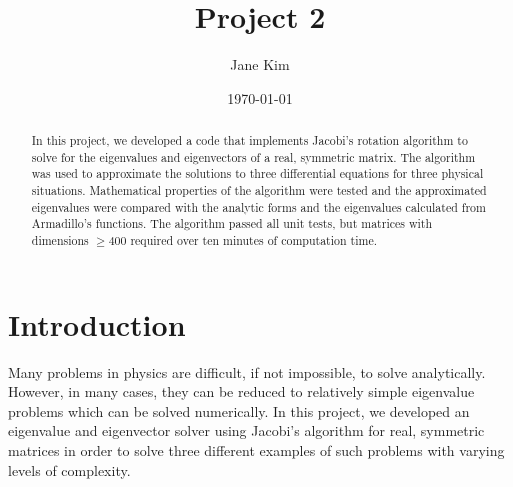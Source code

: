 \documentclass[prb,aps,twocolumn,showpacs,10pt]{revtex4-1}
\begin{document}
\title {Project 2}

\author{Jane Kim}
\date{\today}


\begin{abstract}

\vspace*{5mm}
\noindent In this project, we developed a code that implements Jacobi's rotation algorithm to solve for the eigenvalues and eigenvectors of a real, symmetric matrix. The algorithm was used to approximate the solutions to three differential equations for three physical situations. Mathematical properties of the algorithm were tested and the approximated eigenvalues were compared with the analytic forms and the eigenvalues calculated from Armadillo's functions. The algorithm passed all unit tests, but matrices with dimensions $\geq 400$ required over ten minutes of computation time.
\end{abstract}



\maketitle

\section{Introduction}

Many problems in physics are difficult, if not impossible, to solve analytically. However, in many cases, they can be reduced to relatively simple eigenvalue problems which can be solved numerically. In this project, we developed an eigenvalue and eigenvector solver using Jacobi's algorithm for real, symmetric matrices in order to solve three different examples of such problems with varying levels of complexity.
\end{document}
